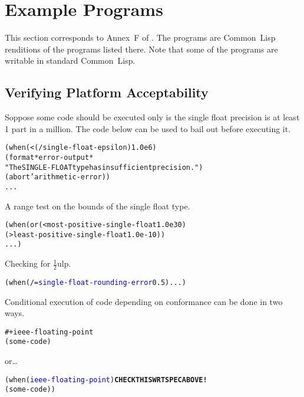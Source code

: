 \documentclass[10pt,fleqn]{article}
\newcommand{\CL}{\textsf{Common~Lisp}}
\newcommand{\codelia}[1]{\textcolor{blue}{#1}}
\begin{document}



\appendix

\section{Example Programs}

This section corresponds to Annex~F of \cite{2012:LIA1}.  The programs
are \CL{} renditions of the programs listed there.  Note that some of
the programs are writable in standard \CL{}.

\subsection{Verifying Platform Acceptability}

Soppose some code should be executed only is the single float
precision is at least 1 part in a million.  The code below can be used
to bail out before executing it.
\begin{alltt}
    (when (< (/ single-float-epsilon) 1.0e6)
        (format *error-output*
                "The SINGLE-FLOAT type has insufficient precision.")
        (abort 'arithmetic-error))
    ...
\end{alltt}

\noindent
A range test on the bounds of the single float type.
\begin{alltt}
    (when (or (< most-positive-single-float 1.0e30)
              (> least-positive-single-float 1.0e-10))
        ...)
\end{alltt}

\noindent
Checking for $\frac{1}{2}$ulp.
\begin{alltt}
    (when (/= \codelia{single-float-rounding-error} 0.5) ...)
\end{alltt}

\noindent
Conditional execution of code depending on conformance can be done in
two ways.
\begin{alltt}
    #+ieee-floating-point 
    (some-code) 
\end{alltt}
or\ldots
\begin{alltt}
    (when (\codelia{ieee-floating-point}) \textbf{CHECK THIS WRT SPEC ABOVE!}
        (some-code))
\end{alltt}
\end{document}
